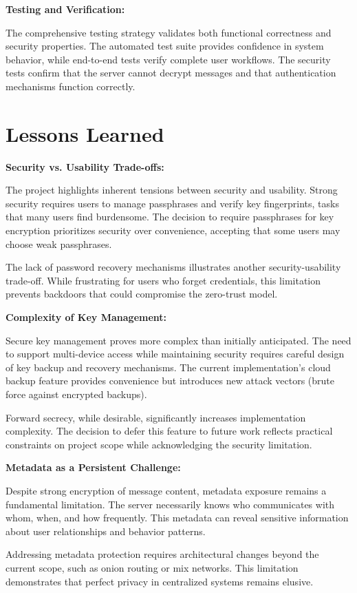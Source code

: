 \textbf{Testing and Verification:}

The comprehensive testing strategy validates both functional correctness and security properties. The automated test suite provides confidence in system behavior, while end-to-end tests verify complete user workflows. The security tests confirm that the server cannot decrypt messages and that authentication mechanisms function correctly.

\section*{Lessons Learned}

\textbf{Security vs. Usability Trade-offs:}

The project highlights inherent tensions between security and usability. Strong security requires users to manage passphrases and verify key fingerprints, tasks that many users find burdensome. The decision to require passphrases for key encryption prioritizes security over convenience, accepting that some users may choose weak passphrases.

The lack of password recovery mechanisms illustrates another security-usability trade-off. While frustrating for users who forget credentials, this limitation prevents backdoors that could compromise the zero-trust model.

\textbf{Complexity of Key Management:}

Secure key management proves more complex than initially anticipated. The need to support multi-device access while maintaining security requires careful design of key backup and recovery mechanisms. The current implementation's cloud backup feature provides convenience but introduces new attack vectors (brute force against encrypted backups).

Forward secrecy, while desirable, significantly increases implementation complexity. The decision to defer this feature to future work reflects practical constraints on project scope while acknowledging the security limitation.

\textbf{Metadata as a Persistent Challenge:}

Despite strong encryption of message content, metadata exposure remains a fundamental limitation. The server necessarily knows who communicates with whom, when, and how frequently. This metadata can reveal sensitive information about user relationships and behavior patterns.

Addressing metadata protection requires architectural changes beyond the current scope, such as onion routing or mix networks. This limitation demonstrates that perfect privacy in centralized systems remains elusive.

